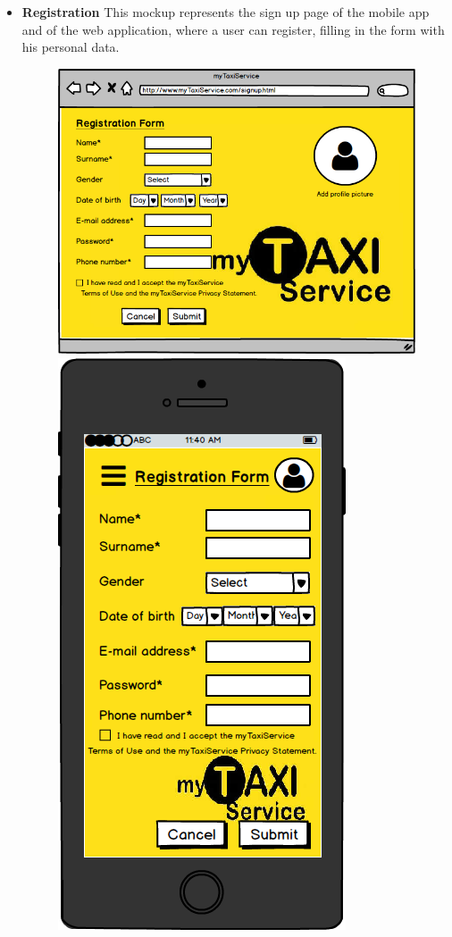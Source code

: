 \documentclass[18pt,oneside,a4paper, titlepage]{article}
\begin{document}
\begin{itemize}
\begin{figure}[h]
				\end{figure}
				\\
				\item \textbf{Registration} This mockup represents the sign up page of the mobile app and of the web application, where a user can register, filling in the form with his personal data.\\
				\begin{figure}[h]
					\includegraphics[scale=0.3]{WebAppRegistration.png}%
					\qquad\qquad
					\includegraphics[scale=0.3]{MobileAppRegistration.png}

\end{figure}
\end{itemize}
\end{document}
